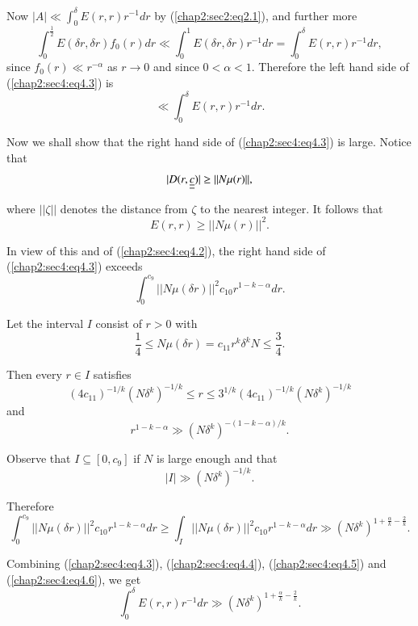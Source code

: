 Now $|A| \ll \int_{0}^{\delta} E(r, r) r^{-1} dr$ by (\ref{chap2:sec2:eq2.1}), and further more
$$
\int_{0}^{\frac{1}{2}} E(\delta r, \delta r)f_{0} (r) dr \ll \int_{0}^{1} E(\delta r, \delta r) r^{-1} dr = \int_{0}^{\delta} E(r, r)r^{-1} dr,
$$
since $f_{0}(r) \ll r^{-\alpha}$ as $r \to 0$ and since $0<\alpha<1$. Therefore the left hand side of (\ref{chap2:sec4:eq4.3}) is
\begin{equation*}
\ll \int_{0}^{\delta} E(r, r) r^{-1} dr.\tag{4.4}\label{chap2:sec4:eq4.4}
\end{equation*}

Now we shall show that the right hand side of (\ref{chap2:sec4:eq4.3}) is large. Notice that
$$
|D(r, \underline{\underline{c}})| \geq ||N \mu(r)||,
$$\pageoriginale

where $||\zeta||$ denotes the distance from $\zeta$ to the nearest integer. It follows that
$$
E(r, r) \geq ||N\mu(r)||^{2}.
$$

In view of this and of (\ref{chap2:sec4:eq4.2}), the right hand side of (\ref{chap2:sec4:eq4.3}) exceeds
\begin{equation*}
\int_{0}^{c_{9}} ||N\mu (\delta r)||^{2} c_{10} r^{1-k-\alpha} dr.\tag{4.5}\label{chap2:sec4:eq4.5}
\end{equation*}

Let the interval $I$ consist of $r > 0$ with 
$$
\frac{1}{4} \leq N\mu (\delta r) = c_{11} r^{k} \delta^{k} N \leq \frac{3}{4}.
$$

Then every $r \in I$ satisfies
$$
(4 c_{11})^{-1/k} (N\delta^{k})^{-1/k} \leq r \leq 3^{1/k} (4 c_{11})^{-1/k} (N \delta^{k})^{-1/k}
$$
and
$$
r^{1-k-\alpha} \gg (N \delta^{k})^{-(1-k-\alpha)/k}.
$$

Observe that $I \subseteq [0, c_{9}]$ if $N$ is large enough and that
$$
|I| \gg (N \delta^{k})^{-1/k}.
$$

Therefore
\begin{equation*}
\int_{0}^{c_{9}} ||N\mu (\delta r)||^{2} c_{10} r^{1-k-\alpha} dr \geq \int_{I} ||N\mu (\delta r)||^{2} c_{10} r^{1-k-\alpha} dr \gg (N \delta^{k})^{1+\frac{\alpha}{k} - \frac{2}{k}}.\tag{4.6}\label{chap2:sec4:eq4.6}
\end{equation*}

Combining (\ref{chap2:sec4:eq4.3}), (\ref{chap2:sec4:eq4.4}), (\ref{chap2:sec4:eq4.5}) and (\ref{chap2:sec4:eq4.6}), we get
\begin{equation*}
\int_{0}^{\delta} E(r, r) r^{-1} dr \gg (N\delta^{k})^{1+\frac{\alpha}{k} - \frac{2}{k}}.
\end{equation*}

